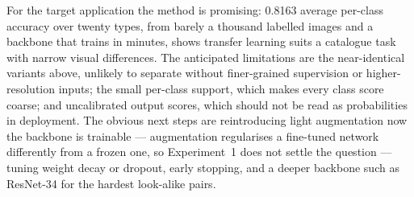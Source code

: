 \documentclass[10pt,a4paper,twocolumn]{article}
\begin{document}
For the target application the method is promising: 0.8163 average per-class accuracy over twenty
types, from barely a thousand labelled images and a backbone that trains in minutes, shows transfer
learning suits a catalogue task with narrow visual differences. The anticipated limitations are the
near-identical variants above, unlikely to separate without finer-grained supervision or
higher-resolution inputs; the small per-class support, which makes every class score coarse; and
uncalibrated output scores, which should not be read as probabilities in deployment. The obvious
next steps are reintroducing light augmentation now the backbone is trainable --- augmentation
regularises a fine-tuned network differently from a frozen one, so Experiment~1 does not settle the
question --- tuning weight decay or dropout, early stopping, and a deeper backbone such as
ResNet-34 for the hardest look-alike pairs.
\end{document}
